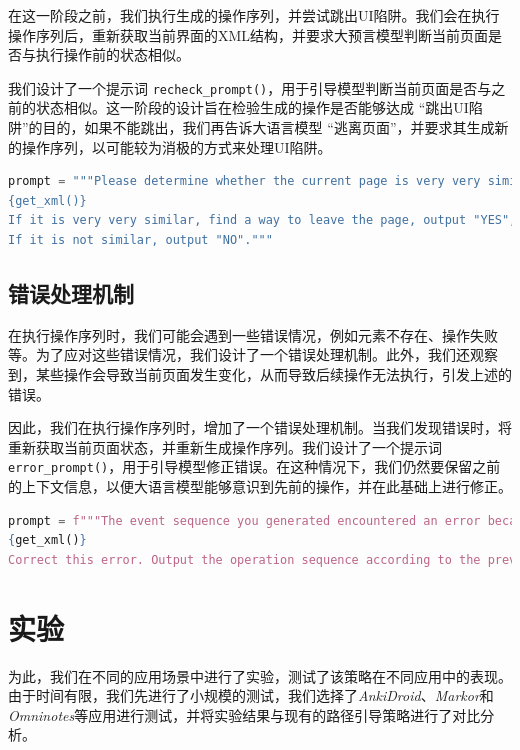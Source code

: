 \documentclass{article}
\begin{document}
在这一阶段之前，我们执行生成的操作序列，并尝试跳出UI陷阱。我们会在执行操作序列后，重新获取当前界面的XML结构，并要求大预言模型判断当前页面是否与执行操作前的状态相似。

我们设计了一个提示词 \texttt{recheck\_prompt()}，用于引导模型判断当前页面是否与之前的状态相似。这一阶段的设计旨在检验生成的操作是否能够达成 ``跳出UI陷阱''的目的，如果不能跳出，我们再告诉大语言模型 ``逃离页面''，并要求其生成新的操作序列，以可能较为消极的方式来处理UI陷阱。

\begin{lstlisting}[language=Python]
prompt = """Please determine whether the current page is very very similar to the previously displayed XML page.
{get_xml()}
If it is very very similar, find a way to leave the page, output "YES", and then output the operation sequence according to the previous rules.
If it is not similar, output "NO"."""
\end{lstlisting}

\subsection{错误处理机制} 

在执行操作序列时，我们可能会遇到一些错误情况，例如元素不存在、操作失败等。为了应对这些错误情况，我们设计了一个错误处理机制。此外，我们还观察到，某些操作会导致当前页面发生变化，从而导致后续操作无法执行，引发上述的错误。

因此，我们在执行操作序列时，增加了一个错误处理机制。当我们发现错误时，将重新获取当前页面状态，并重新生成操作序列。我们设计了一个提示词 \texttt{error\_prompt()}，用于引导模型修正错误。在这种情况下，我们仍然要保留之前的上下文信息，以便大语言模型能够意识到先前的操作，并在此基础上进行修正。

\begin{lstlisting}[language=Python]
prompt = f"""The event sequence you generated encountered an error because the corresponding element could not be found. This is the current XML representation of the application.
{get_xml()}
Correct this error. Output the operation sequence according to the previous rules."""
\end{lstlisting}

\section{实验}

为此，我们在不同的应用场景中进行了实验，测试了该策略在不同应用中的表现。由于时间有限，我们先进行了小规模的测试，我们选择了\textit{AnkiDroid}、\textit{Markor}和\textit{Omninotes}等应用进行测试，并将实验结果与现有的路径引导策略进行了对比分析。
\end{document}
